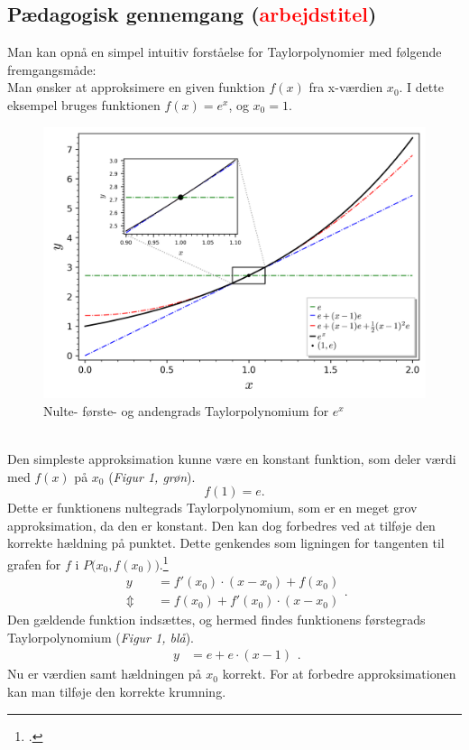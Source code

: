 \documentclass[12pt, a4paper]{article}
\begin{document}
\begin{refsection}
\subsection{Pædagogisk gennemgang (\textcolor{red}{arbejdstitel})}
Man kan opnå en simpel intuitiv forståelse for Taylorpolynomier med følgende fremgangsmåde:\\
Man ønsker at approksimere en given funktion $f(x)$ fra x-værdien $x_0$. I dette eksempel bruges funktionen $f(x)=e^x$, og $x_0=1$.\\
\begin{figure}[h!]
     \includegraphics[width=\textwidth]{figures/ex-eksempel.png}
     \caption{Nulte- første- og andengrads Taylorpolynomium for $e^x$}
     \label{fig:boat1}
\end{figure}\\
Den simpleste approksimation kunne være en konstant funktion, som deler værdi med $f(x)$ på $x_0$ (\textit{Figur 1, grøn}).
\[
f(1)=e
.\] 
Dette er funktionens nultegrads Taylorpolynomium, som er en meget grov approksimation, da den er konstant. Den kan dog forbedres ved at tilføje den korrekte hældning på punktet. Dette genkendes som ligningen for tangenten til grafen for $f$ i $P\big(x_0,f(x_0)\big)$.\footcite[s. 24, frml. 130]{formelsamling}
\[
\begin{aligned}
    y&=f'(x_0) \cdot (x-x_0)+f(x_0)\\
    \Updownarrow\quad &=f(x_0)+f'(x_0) \cdot (x-x_0)
\end{aligned}
.\] 
Den gældende funktion indsættes, og hermed findes funktionens førstegrads Taylorpolynomium  (\textit{Figur 1, blå}).\\
\[
\begin{aligned}
    y&=e+e\cdot (x-1)
\end{aligned}
.\] 
Nu er værdien samt hældningen på $x_0$ korrekt. For at forbedre approksimationen kan man tilføje den korrekte krumning. 

\end{refsection}
\end{document}
